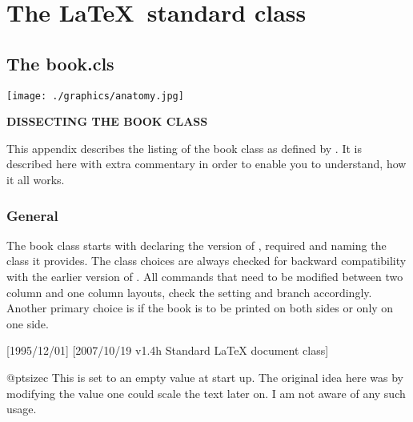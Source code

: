 \part{The \LaTeX\ standard class}
\parindent0pt
\setlength\columnsep{2em}
\def\Paragraph#1{{\bf #1}\quad}
\chapter{The book.cls}

\clearpage

\texttt{[image: ./graphics/anatomy.jpg]}

\vspace{2\baselineskip}

\textbf{\Large DISSECTING THE BOOK CLASS}
\thispagestyle{plain}
\begin{multicols}{2}
This appendix describes the listing of the book class as defined by \latex. It is described here with extra commentary in order to enable you to understand, how it all works.

\lipsum[1-3]
\end{multicols}

\section{General}
\pagestyle{headings}

The book class starts with declaring the version of \latex, required
and naming the class it provides. The class choices are always checked for backward compatibility with the earlier version of \latex. All commands that need to be modified between two column and one column layouts, check the setting and branch accordingly. Another primary choice is if the book is to be printed on both sides or only on one side.


\begin{teX}
[1995/12/01]
              [2007/10/19 v1.4h
 Standard LaTeX document class]
\end{teX}

\begin{docCommand}{@ptsize}{c}
This is set to an empty value at start up. The original idea here was by modifying the value one could scale the
text later on. I am not aware of any such usage.
\end{docCommand}

\begin{teX}
\newcommand\@ptsize{}
\newif\if@restonecol
\newif\if@titlepage \@titlepagetrue
\newif\if@openright
\newif\if@mainmatter \@mainmattertrue
\end{teX}


